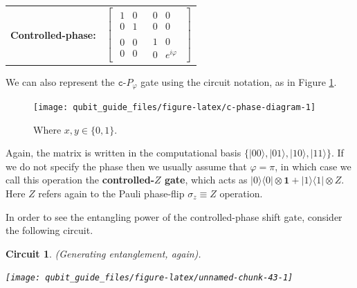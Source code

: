 \documentclass[fleqn,a4paper]{article}
\newenvironment{idea}{\everypar{\setlength{\parindent}{1.5em}}}{}
\newtheorem*{circuit}{Circuit}
\theoremstyle{definition}
\theoremstyle{definition}
\theoremstyle{definition}
\theoremstyle{definition}
\theoremstyle{remark}
\begin{document}
\begin{idea}

\centering
\begin{tabular}{ll}
  \textbf{Controlled-phase:}
  & $\left[\begin{array}{c|c}\begin{matrix}1&0\\0&1\end{matrix}&\begin{matrix}0&0\\0&0\end{matrix}\\\hline\begin{matrix}0&0\\0&0\end{matrix}&\begin{matrix}1&0\\0&e^{i\varphi}\end{matrix}\end{array}\right]$
\end{tabular}

\end{idea}

We can also represent the \(\texttt{c-}P_\varphi\) gate using the circuit notation, as in Figure \ref{fig:c-phase-diagram}.



\begin{figure}[H]

{\centering \texttt{[image: qubit\_guide\_files/figure-latex/c-phase-diagram-1]} 

}

\caption{Where \(x,y\in\{0,1\}\).}\label{fig:c-phase-diagram}
\end{figure}

Again, the matrix is written in the computational basis \(\{|00\rangle,|01\rangle,|10\rangle,|11\rangle\}\).
If we do not specify the phase then we usually assume that \(\varphi=\pi\), in which case we call this operation the \textbf{controlled-\(Z\) gate}, which acts as \(|0\rangle\langle 0|\otimes\mathbf{1}+ |1\rangle\langle 1|\otimes Z\).
Here \(Z\) refers again to the Pauli phase-flip \(\sigma_z\equiv Z\) operation.

In order to see the entangling power of the controlled-phase shift gate, consider the following circuit.

\begin{circuit}

\emph{(Generating entanglement, again).}

\begin{center}\texttt{[image: qubit\_guide\_files/figure-latex/unnamed-chunk-43-1]} \end{center}

\end{circuit}
\end{document}
